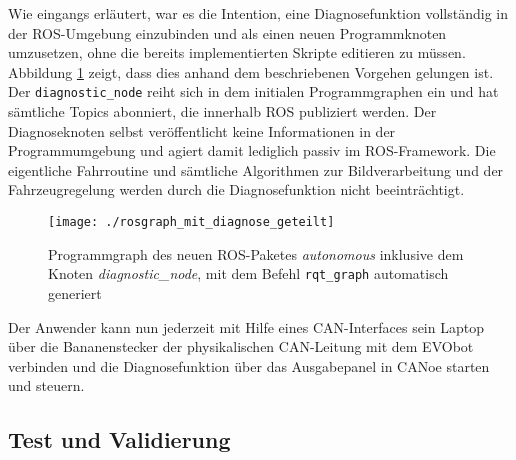 Wie eingangs erläutert, war es die Intention, eine Diagnosefunktion  vollständig in der ROS-Umgebung einzubinden und als einen neuen Programmknoten umzusetzen, ohne die bereits implementierten Skripte editieren zu müssen. Abbildung \ref{abb:rosgraphMitDiagnose} zeigt, dass dies anhand dem beschriebenen Vorgehen gelungen ist. Der \texttt{diagnostic\_node} reiht sich in dem initialen Programmgraphen ein und hat sämtliche Topics abonniert, die innerhalb ROS publiziert werden. Der Diagnoseknoten selbst veröffentlicht keine Informationen in der Programmumgebung und agiert damit lediglich passiv im ROS-Framework. Die eigentliche Fahrroutine und sämtliche Algorithmen zur Bildverarbeitung und der Fahrzeugregelung werden durch die Diagnosefunktion nicht beeinträchtigt.

\begin{figure}[!htbp]
	\centering
	\texttt{[image: ./rosgraph\_mit\_diagnose\_geteilt]}
	\caption{Programmgraph des neuen ROS-Paketes \emph{autonomous} inklusive dem Knoten \emph{diagnostic\_node}, mit dem Befehl \texttt{rqt\_graph} automatisch generiert}
	\label{abb:rosgraphMitDiagnose}
\end{figure} 

Der Anwender kann nun jederzeit mit Hilfe eines CAN-Interfaces sein Laptop über die Bananenstecker der physikalischen CAN-Leitung mit dem EVObot verbinden und die Diagnosefunktion über das Ausgabepanel in CANoe starten und steuern.


\subsection{Test und Validierung} \label{subsec:TestValidierungDiagnose}

